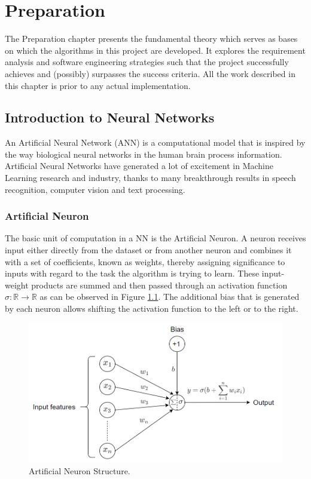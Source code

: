 

\chapter{Preparation}

The Preparation chapter presents the fundamental theory which serves as bases on which the algorithms in this project are developed. It explores the requirement analysis and software engineering strategies such that the project successfully achieves and (possibly) surpasses the success criteria. All the work described in this chapter is prior to any actual implementation.


\section{Introduction to Neural Networks}

An Artificial Neural Network (ANN) is a computational model that is inspired by the way biological neural networks in the human brain process information. Artificial Neural Networks have generated a lot of excitement in Machine Learning research and industry, thanks to many breakthrough results in speech recognition, computer vision and text processing.

\subsection{Artificial Neuron}

The basic unit of computation in a NN is the Artificial Neuron. A neuron receives input either directly from the dataset or from another neuron and combines it with a set of coefficients, known as weights, thereby assigning significance to inputs with regard to the task the algorithm is trying to learn. These input-weight products are summed and then passed through an activation function $\sigma : \mathbb{R} \rightarrow \mathbb{R}$ as can be observed in Figure \ref{Artificial Neuron}. The additional bias that is generated by each neuron allows shifting the activation function to the left or to the right. \\

\begin{figure}[H]
  \centering
  \includegraphics[scale = 0.5]{Images/artificial_neuron.png}
  \caption{Artificial Neuron Structure.}
  \label{Artificial Neuron}
\end{figure}

